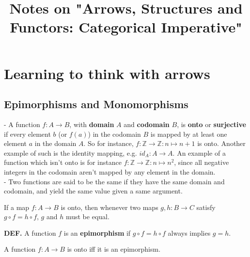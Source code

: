 \documentclass[a4paper,12pt,twoside,leqno]{article}
\title{Notes on "Arrows, Structures and Functors: Categorical Imperative"}
\author{}
\date{}
\begin{document}
\maketitle
\section{Learning to think with arrows}
\subsection{Epimorphisms and Monomorphisms}

- A function $f: A \rightarrow B$, with \textbf{domain} $A$ and \textbf{codomain} $B$, is \textbf{onto} or \textbf{surjective} if every element $b$ (or $f(a)$) in the codomain $B$ is mapped by at least one element $a$ in the domain $A$. So for instance, $f: \mathbb{Z} \rightarrow \mathbb{Z}: n \mapsto n + 1$ is onto. Another example of such is the identity mapping, e.g. $id_{A}: A \rightarrow A$. An example of a function which isn't onto is for instance $f: \mathbb{Z} \rightarrow \mathbb{Z}: n \mapsto n^2$, since all negative integers in the codomain aren't mapped by any element in the domain.\\
- Two functions are said to be the same if they have the same domain and codomain, and yield the same value given a same argument.

\begin{theorem}

If a map $f: A \rightarrow B$ is onto, then whenever two maps $g, h: B \rightarrow C$ satisfy $g \circ f = h \circ f$, $g$ and $h$ must be equal.

\end{theorem}

\begin{theorem}

\textbf{DEF.} A function $f$ is an \textbf{epimorphism} if $g \circ f = h \circ f$ always implies $g = h$.

\end{theorem}

\begin{theorem}

A function $f: A \rightarrow B$ is onto iff it is an epimorphism.

\end{theorem}
\end{document}
